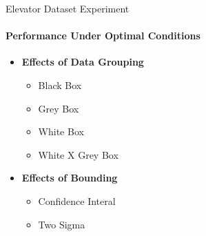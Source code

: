 \documentclass{beamer}
\begin{document}
\begin{frame}[t]{Elevator Dataset Experiment}
  \framesubtitle{Performance Under Optimal Conditions}
  \begin{itemize}
    \setlength\itemsep{1em}

  \item \textbf{Effects of Data Grouping}
    \begin{itemize}
      \item Black Box
      \item Grey Box
      \item White Box
      \item White X Grey Box
    \end{itemize}
  \item \textbf{Effects of Bounding}
    \begin{itemize}
      \item Confidence Interal
      \item Two Sigma
    \end{itemize}
  \end{itemize}
\end{frame}
\end{document}
